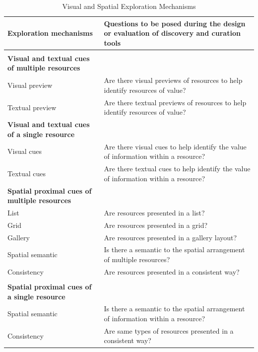 \documentclass{sigchi}
\begin{document}
{{{\begin{table}[ht!]
\caption{Visual and Spatial Exploration Mechanisms}
\label{table:exploration} 
\begin{tabular}{|p{}| p{}|}
\hline
Exploration mechanisms & Questions to be posed during the design or evaluation of discovery and curation tools  \\
\hline
 & \\
\textbf{Visual and textual cues of multiple resources} & \\
Visual preview  & Are there visual previews of resources to help identify resources of value? \\
Textual preview & Are there textual previews of resources to help identify resources of value? \\
\textbf{Visual and textual cues of a single resource} & \\
Visual cues                 & Are there visual cues to help identify the value of information within a resource? \\
Textual cues                & Are there textual cues to help identify the value of information within a resource? \\
\textbf{Spatial proximal cues of multiple resources} & \\
List  						& Are resources presented in a list? \\
Grid   						& Are resources presented in a grid? \\
Gallery  					& Are resources presented in a gallery layout? \\
Spatial semantic            & Is there a semantic to the spatial arrangement of multiple resources? \\ 
Consistency				 	& Are resources presented in a consistent way? \\                                                    
 & \\
\textbf{Spatial proximal cues of a single resource} & \\
Spatial semantic            & Is there a semantic to the spatial arrangement of information within a resource? \\
Consistency   				& Are same types of resources presented in a consistent way?\\                                                       
\hline
\end{tabular}
\end{table}

} %

}}
\end{document}
